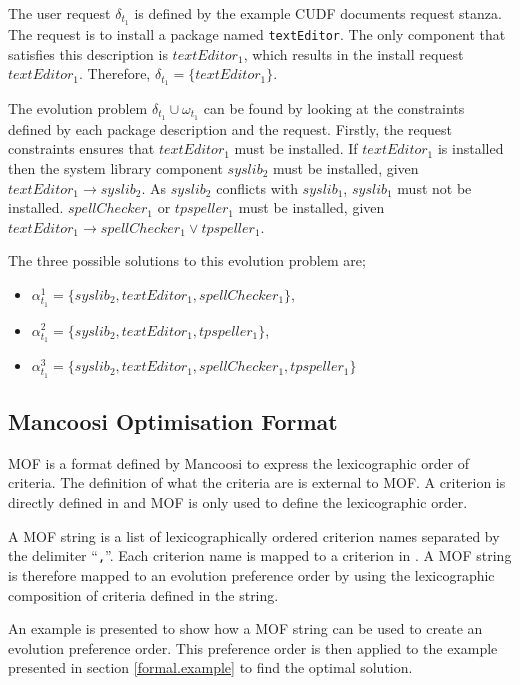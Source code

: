 The user request $\delta_{t_1}$ is defined by the example CUDF documents request stanza.
The request is to install a package named \texttt{textEditor}.
The only component that satisfies this description is $textEditor_1$, which results in the install request $textEditor_1$.
Therefore, $\delta_{t_1} = \{textEditor_1\}$.

The evolution problem $\delta_{t_1} \cup \omega_{t_1}$ can be found by looking at the constraints defined by each package description and the request.
Firstly, the request constraints ensures that $textEditor_1$ must be installed.
If $textEditor_1$ is installed then the system library component $syslib_2$ must be installed, given $textEditor_1 \rightarrow syslib_2$.
As $syslib_2$ conflicts with $syslib_1$, $syslib_1$ must not be installed.
$spellChecker_1$ or $tpspeller_1$ must be installed, given $textEditor_1 \rightarrow spellChecker_1 \vee tpspeller_1$.

The three possible solutions to this evolution problem are;
\begin{itemize}
  \item $\alpha_{t_1}^1 = \{syslib_2, textEditor_1, spellChecker_1\}$,
  \item $\alpha_{t_1}^2 = \{syslib_2, textEditor_1, tpspeller_1\}$,
  \item $\alpha_{t_1}^3 = \{syslib_2, textEditor_1, spellChecker_1, tpspeller_1\}$
\end{itemize}

\subsection{Mancoosi Optimisation Format}
\label{formal.mancoosioptimisationformat}
MOF is a format defined by Mancoosi to express the lexicographic order of criteria.
The definition of what the criteria are is external to MOF.
A criterion is directly defined in \modelname and MOF is only used to define the lexicographic order. 

A MOF string is a list of lexicographically ordered criterion names separated by the delimiter ``\texttt{,}''.
Each criterion name is mapped to a criterion in \modelname.
A MOF string is therefore mapped to an evolution preference order by using the lexicographic composition of criteria defined in the string.

An example is presented to show how a MOF string can be used to create an evolution preference order.
This preference order is then applied to the example presented in section \ref{formal.example} to find the optimal solution.

